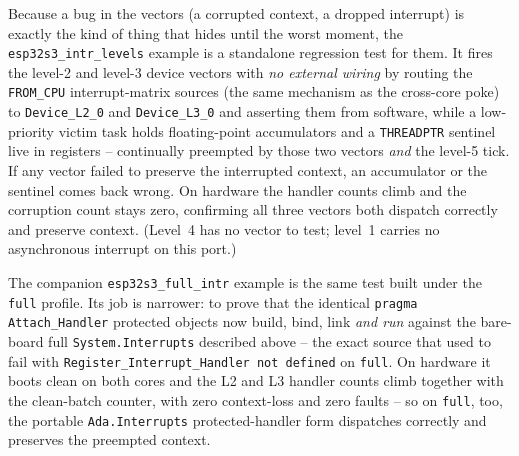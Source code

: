 Because a bug in the vectors (a corrupted context, a dropped interrupt) is exactly
the kind of thing that hides until the worst moment, the
\texttt{esp32s3\_intr\_levels} example is a standalone regression test for them. It
fires the level-2 and level-3 device vectors with \emph{no external wiring} by
routing the \texttt{FROM\_CPU} interrupt-matrix sources (the same mechanism as the
cross-core poke) to \texttt{Device\_L2\_0} and \texttt{Device\_L3\_0} and asserting
them from software, while a low-priority victim task holds floating-point
accumulators and a \texttt{THREADPTR} sentinel live in registers -- continually
preempted by those two vectors \emph{and} the level-5 tick. If any vector failed
to preserve the interrupted context, an accumulator or the sentinel comes back
wrong. On hardware the handler counts climb and the corruption count stays zero,
confirming all three vectors both dispatch correctly and preserve context.
(Level~4 has no vector to test; level~1 carries no asynchronous interrupt on this
port.)

The companion \texttt{esp32s3\_full\_intr} example is the same test built under
the \texttt{full} profile. Its job is narrower: to prove that the identical
\texttt{pragma Attach\_Handler} protected objects now build, bind, link \emph{and
run} against the bare-board full \texttt{System.Interrupts} described above --
the exact source that used to fail with \texttt{Register\_Interrupt\_Handler not
defined} on \texttt{full}. On hardware it boots clean on both cores and the L2
and L3 handler counts climb together with the clean-batch counter, with zero
context-loss and zero faults -- so on \texttt{full}, too, the portable
\texttt{Ada.Interrupts} protected-handler form dispatches correctly and preserves
the preempted context.
